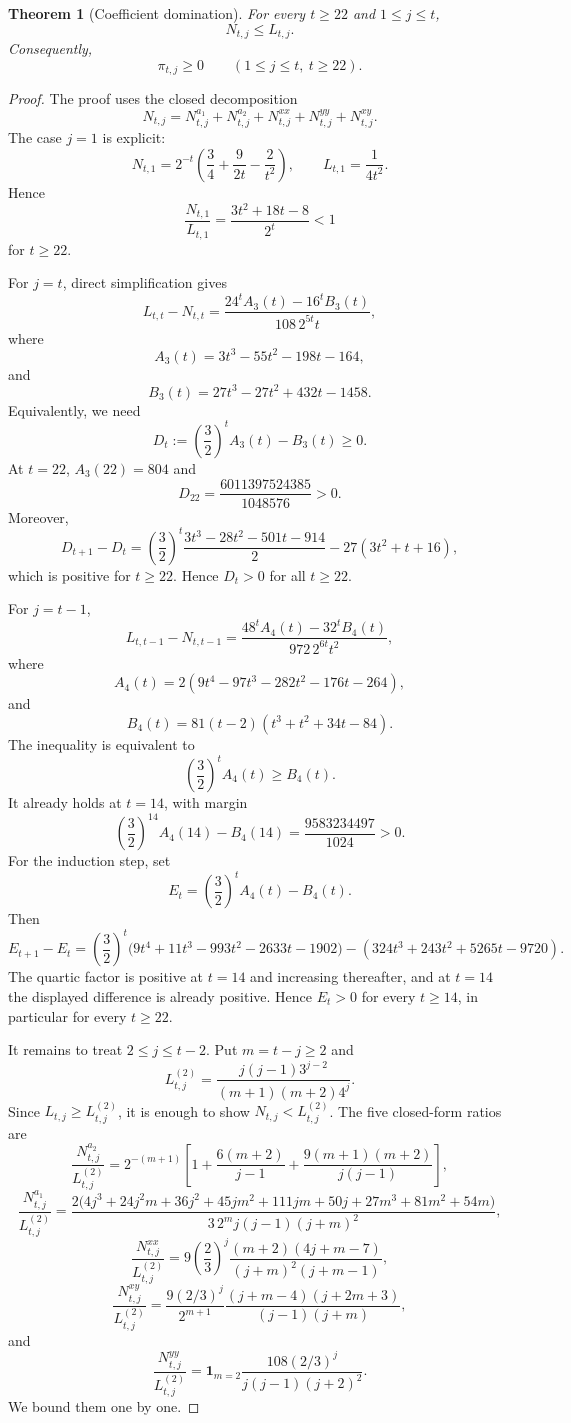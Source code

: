 \documentclass[11pt]{article}
\newtheorem{theorem}{Theorem}[section]
\theoremstyle{definition}
\newcommand{\ones}{\mathbf 1}
\begin{document}
\begin{theorem}[Coefficient domination]\label{thm:NleL}
For every $t\ge22$ and $1\le j\le t$,
\[
  N_{t,j}\le L_{t,j}.
\]
Consequently,
\[
  \pi_{t,j}\ge0\qquad(1\le j\le t,\ t\ge22).
\]
\end{theorem}

\begin{proof}
The proof uses the closed decomposition
\[
  N_{t,j}=N^{a_1}_{t,j}+N^{a_2}_{t,j}+N^{xx}_{t,j}+N^{yy}_{t,j}+N^{xy}_{t,j}.
\]
The case $j=1$ is explicit:
\[
  N_{t,1}=2^{-t}\left(\frac34+\frac9{2t}-\frac2{t^2}\right),
  \qquad L_{t,1}=\frac1{4t^2}.
\]
Hence
\[
  \frac{N_{t,1}}{L_{t,1}}=\frac{3t^2+18t-8}{2^t}<1
\]
for $t\ge22$.

For $j=t$, direct simplification gives
\[
  L_{t,t}-N_{t,t}
  =\frac{24^tA_3(t)-16^tB_3(t)}{108\,2^{5t}t},
\]
where
\[
  A_3(t)=3t^3-55t^2-198t-164,
\]
and
\[
  B_3(t)=27t^3-27t^2+432t-1458.
\]
Equivalently, we need
\[
  D_t:=\left(\frac32\right)^t A_3(t)-B_3(t)\ge0.
\]
At $t=22$, $A_3(22)=804$ and
\[
  D_{22}=\frac{6011397524385}{1048576}>0.
\]
Moreover,
\[
D_{t+1}-D_t
=\left(\frac32\right)^t\frac{3t^3-28t^2-501t-914}{2}
-27(3t^2+t+16),
\]
which is positive for $t\ge22$.  Hence $D_t>0$ for all $t\ge22$.

For $j=t-1$,
\[
  L_{t,t-1}-N_{t,t-1}
  =\frac{48^tA_4(t)-32^tB_4(t)}{972\,2^{6t}t^2},
\]
where
\[
  A_4(t)=2(9t^4-97t^3-282t^2-176t-264),
\]
and
\[
  B_4(t)=81(t-2)(t^3+t^2+34t-84).
\]
The inequality is equivalent to
\[
  \left(\frac32\right)^tA_4(t)\ge B_4(t).
\]
It already holds at $t=14$, with margin
\[
  \left(\frac32\right)^{14}A_4(14)-B_4(14)=\frac{9583234497}{1024}>0.
\]
For the induction step, set
\[
  E_t=\left(\frac32\right)^tA_4(t)-B_4(t).
\]
Then
\[
  E_{t+1}-E_t
  =\left(\frac32\right)^t
   \bigl(9t^4+11t^3-993t^2-2633t-1902\bigr)
   -(324t^3+243t^2+5265t-9720).
\]
The quartic factor is positive at $t=14$ and increasing thereafter, and
at $t=14$ the displayed difference is already positive.  Hence
$E_t>0$ for every $t\ge14$, in particular for every $t\ge22$.

It remains to treat $2\le j\le t-2$.  Put $m=t-j\ge2$ and
\[
  L^{(2)}_{t,j}=\frac{j(j-1)3^{j-2}}{(m+1)(m+2)4^j}.
\]
Since $L_{t,j}\ge L^{(2)}_{t,j}$, it is enough to show
$N_{t,j}<L^{(2)}_{t,j}$.  The five closed-form ratios are
\[
\frac{N^{a_2}_{t,j}}{L^{(2)}_{t,j}}
=2^{-(m+1)}\left[1+\frac{6(m+2)}{j-1}+\frac{9(m+1)(m+2)}{j(j-1)}\right],
\]
\[
\frac{N^{a_1}_{t,j}}{L^{(2)}_{t,j}}
=\frac{2\bigl(4j^3+24j^2m+36j^2+45jm^2+111jm+50j+27m^3+81m^2+54m\bigr)}{3\,2^m j(j-1)(j+m)^2},
\]
\[
\frac{N^{xx}_{t,j}}{L^{(2)}_{t,j}}
=9\left(\frac23\right)^j
\frac{(m+2)(4j+m-7)}{(j+m)^2(j+m-1)},
\]
\[
\frac{N^{xy}_{t,j}}{L^{(2)}_{t,j}}
=\frac{9(2/3)^j}{2^{m+1}}
\frac{(j+m-4)(j+2m+3)}{(j-1)(j+m)},
\]
and
\[
\frac{N^{yy}_{t,j}}{L^{(2)}_{t,j}}
=\ones_{m=2}\frac{108(2/3)^j}{j(j-1)(j+2)^2}.
\]
We bound them one by one.


\end{proof}
\end{document}
